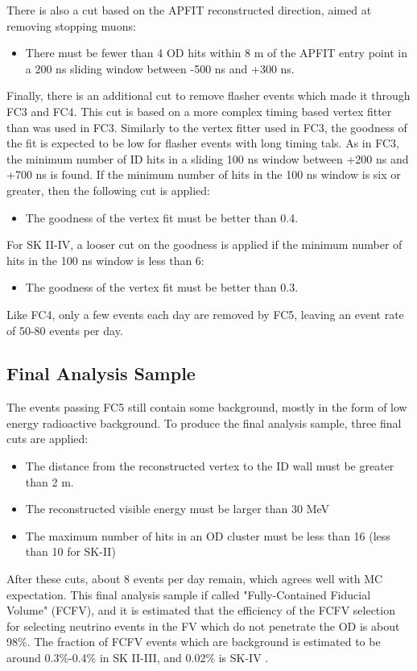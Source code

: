 \par 
There is also a cut based on the APFIT reconstructed direction, aimed at removing stopping muons:
\begin{itemize}
\item There must be fewer than 4 OD hits within 8 m of the APFIT entry point in a 200 ns sliding window between -500 ns and +300 ns.
\end{itemize}
\par
Finally, there is an additional cut to remove flasher events which made it through FC3 and FC4.  This cut is based on a more complex timing based vertex fitter than was used in FC3.  Similarly to the vertex fitter used in FC3, the goodness of the fit is expected to be low for flasher events with long timing tals.  As in FC3, the minimum number of ID hits in a sliding 100 ns window between +200 ns and +700 ns is found.  If the minimum number of hits in the 100 ns window is six or greater, then the following cut is applied:
\begin{itemize}
\item The goodness of the vertex fit must be better than 0.4.
\end{itemize}
For SK II-IV, a looser cut on the goodness is applied if the minimum number of hits in the 100 ns window is less than 6:
\begin{itemize}
\item The goodness of the vertex fit must be better than 0.3.
\end{itemize}
Like FC4, only a few events each day are removed by FC5, leaving an event rate of 50-80 events per day. 
\subsection{Final Analysis Sample}
The events passing FC5 still contain some background, mostly in the form of low energy radioactive background.   To produce the final analysis sample, three final cuts are applied:
\begin{itemize}
\item The distance from the reconstructed vertex to the ID wall must be greater than 2 m.
\item The reconstructed visible energy must be larger than 30 MeV
\item The maximum number of hits in an OD cluster must be less than 16 (less than 10 for SK-II)
\end{itemize}
After these cuts, about 8 events per day remain, which agrees well with MC expectation.  This final analysis sample if called "Fully-Contained Fiducial Volume" (FCFV), and it is estimated that the efficiency of the FCFV selection for selecting neutrino events in the FV which do not penetrate the OD is about 98\%.  The fraction of FCFV events which are background is estimated to be around 0.3\%-0.4\% in SK II-III, and 0.02\% is SK-IV \cite{Richard:2015kd}.